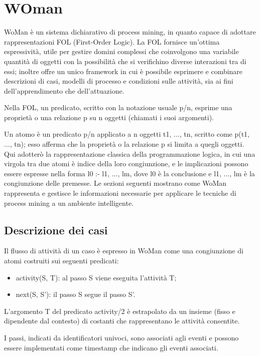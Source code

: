 \chapter{WOman}
\cite{IncrLearnDailyRoutWorkflowSmartHomeEnvir} \cite{WoMan} WoMan è un sistema dichiarativo di process mining, in quanto capace di adottare rappresentazioni FOL (First-Order Logic). La FOL fornisce un'ottima espressività, utile per gestire domini complessi che coinvolgono una variabile quantità di oggetti con la possibilità che si verifichino diverse interazioni tra di essi; inoltre offre un unico framework in cui è possibile esprimere e combinare descrizioni di casi, modelli di processo e condizioni sulle attività, sia ai fini dell’apprendimento che dell’attuazione. 

Nella FOL, un predicato, scritto con la notazione usuale p/n, esprime una proprietà o una relazione p su n oggetti (chiamati i suoi argomenti). 

Un atomo è un predicato p/n applicato a n oggetti t1, ..., tn, scritto come p(t1, ..., tn); esso afferma che la proprietà o la relazione p si limita a quegli oggetti. Qui adotterò la rappresentazione classica della programmazione logica, in cui una virgola tra due atomi è indice della loro congiunzione, e le implicazioni possono essere espresse nella forma l0 :- l1, ..., lm, dove l0 è la conclusione e l1, ..., lm è la congiunzione delle premesse. Le sezioni seguenti mostrano come WoMan rappresenta e gestisce le informazioni necessarie per applicare le tecniche di process mining a un ambiente intelligente.

\section{Descrizione dei casi}
Il flusso di attività di un caso è espresso in WoMan come una congiunzione di atomi costruiti sui seguenti predicati:
\begin{itemize}
\item activity(S, T): al passo S viene eseguita l'attività T;
\item next(S, S'): il passo S segue il passo S'.
\end{itemize}

L'argomento T del predicato activity/2 è estrapolato da un insieme (fisso e dipendente dal contesto) di costanti che rappresentano le attività consentite. 

I passi, indicati da identificatori univoci, sono associati agli eventi e possono essere implementati come timestamp che indicano gli eventi associati. 

